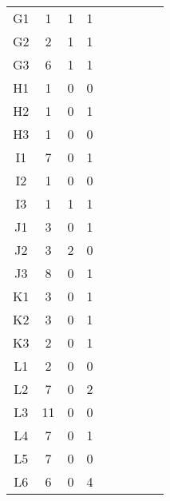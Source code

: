 \begin{center}
\begin{longtable}{ccccc|cccc}
G1    & 1     & 1     & 1 \\
G2    & 2     & 1     & 1 \\
G3    & 6     & 1     & 1 \\
H1    & 1     & 0     & 0 \\
H2    & 1     & 0     & 1 \\
H3    & 1     & 0     & 0 \\
I1    & 7     & 0     & 1 \\
I2    & 1     & 0     & 0 \\
I3    & 1     & 1     & 1 \\
J1    & 3     & 0     & 1 \\
J2    & 3     & 2     & 0 \\
J3    & 8     & 0     & 1 \\
K1    & 3     & 0     & 1 \\
K2    & 3     & 0     & 1 \\
K3    & 2     & 0     & 1 \\
L1    & 2     & 0     & 0 \\
L2    & 7     & 0     & 2 \\
L3    & 11    & 0     & 0 \\
L4    & 7     & 0     & 1 \\
L5    & 7     & 0     & 0 \\
L6    & 6     & 0     & 4 \\


\end{longtable}
\end{center}

